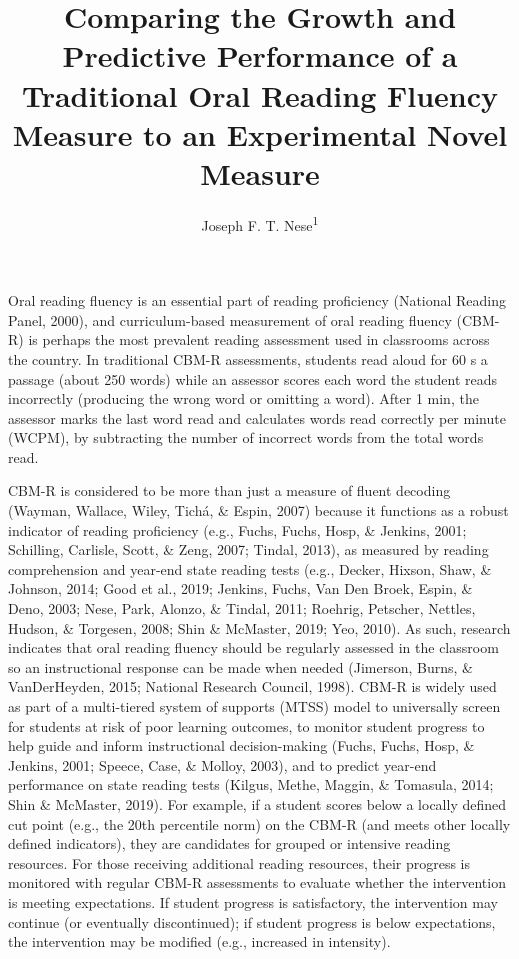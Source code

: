 \documentclass[
  english,
  man, fleqn, noextraspace]{apa6}
\title{Comparing the Growth and Predictive Performance of a Traditional Oral Reading Fluency Measure to an Experimental Novel Measure}
\author{Joseph F. T. Nese\textsuperscript{1}}
\date{}
\affiliation{\vspace{0.5cm}\textsuperscript{1} University of Oregon}
\begin{document}
\maketitle

Oral reading fluency is an essential part of reading proficiency (National Reading Panel, 2000), and curriculum-based measurement of oral reading fluency (CBM-R) is perhaps the most prevalent reading assessment used in classrooms across the country. In traditional CBM-R assessments, students read aloud for 60 s a passage (about 250 words) while an assessor scores each word the student reads incorrectly (producing the wrong word or omitting a word). After 1 min, the assessor marks the last word read and calculates words read correctly per minute (WCPM), by subtracting the number of incorrect words from the total words read.

CBM-R is considered to be more than just a measure of fluent decoding (Wayman, Wallace, Wiley, Tichá, \& Espin, 2007) because it functions as a robust indicator of reading proficiency (e.g., Fuchs, Fuchs, Hosp, \& Jenkins, 2001; Schilling, Carlisle, Scott, \& Zeng, 2007; Tindal, 2013), as measured by reading comprehension and year-end state reading tests (e.g., Decker, Hixson, Shaw, \& Johnson, 2014; Good et al., 2019; Jenkins, Fuchs, Van Den Broek, Espin, \& Deno, 2003; Nese, Park, Alonzo, \& Tindal, 2011; Roehrig, Petscher, Nettles, Hudson, \& Torgesen, 2008; Shin \& McMaster, 2019; Yeo, 2010). As such, research indicates that oral reading fluency should be regularly assessed in the classroom so an instructional response can be made when needed (Jimerson, Burns, \& VanDerHeyden, 2015; National Research Council, 1998). CBM-R is widely used as part of a multi-tiered system of supports (MTSS) model to universally screen for students at risk of poor learning outcomes, to monitor student progress to help guide and inform instructional decision-making (Fuchs, Fuchs, Hosp, \& Jenkins, 2001; Speece, Case, \& Molloy, 2003), and to predict year-end performance on state reading tests (Kilgus, Methe, Maggin, \& Tomasula, 2014; Shin \& McMaster, 2019). For example, if a student scores below a locally defined cut point (e.g., the 20th percentile norm) on the CBM-R (and meets other locally defined indicators), they are candidates for grouped or intensive reading resources. For those receiving additional reading resources, their progress is monitored with regular CBM-R assessments to evaluate whether the intervention is meeting expectations. If student progress is satisfactory, the intervention may continue (or eventually discontinued); if student progress is below expectations, the intervention may be modified (e.g., increased in intensity).
\end{document}
